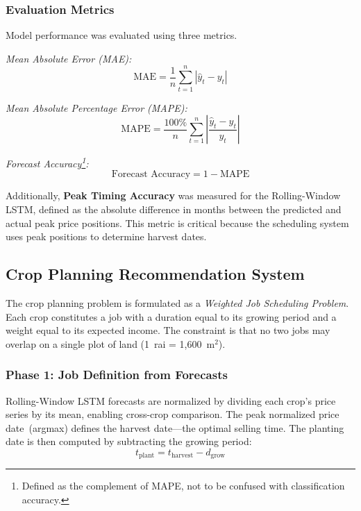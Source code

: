\documentclass[conference]{IEEEtran}
\begin{document}
\subsubsection{Evaluation Metrics}

Model performance was evaluated using three metrics.

\textit{Mean Absolute Error (MAE):}
\begin{equation}
  \text{MAE} = \frac{1}{n}\sum_{t=1}^{n}|\hat{y}_t - y_t|
\end{equation}

\textit{Mean Absolute Percentage Error (MAPE):}
\begin{equation}
  \text{MAPE} = \frac{100\%}{n}\sum_{t=1}^{n}\left|\frac{\hat{y}_t - y_t}{y_t}\right|
\end{equation}

\textit{Forecast Accuracy\footnote{Defined as the complement of MAPE, not to be confused with classification accuracy.}:}
\begin{equation}
  \text{Forecast Accuracy} = 1 - \text{MAPE}
\end{equation}

Additionally, \textbf{Peak Timing Accuracy} was measured for the Rolling-Window LSTM, defined as the absolute difference in months between the predicted and actual peak price positions. This metric is critical because the scheduling system uses peak positions to determine harvest dates.

\subsection{Crop Planning Recommendation System}

The crop planning problem is formulated as a \textit{Weighted Job Scheduling Problem}. Each crop constitutes a job with a duration equal to its growing period and a weight equal to its expected income. The constraint is that no two jobs may overlap on a single plot of land (1~rai = 1,600~m$^2$).

\subsubsection{Phase 1: Job Definition from Forecasts}

Rolling-Window LSTM forecasts are normalized by dividing each crop's price series by its mean, enabling cross-crop comparison. The peak normalized price date~(argmax) defines the harvest date---the optimal selling time. The planting date is then computed by subtracting the growing period:
\begin{equation}
  t_{\text{plant}} = t_{\text{harvest}} - d_{\text{grow}}
\end{equation}
\end{document}
